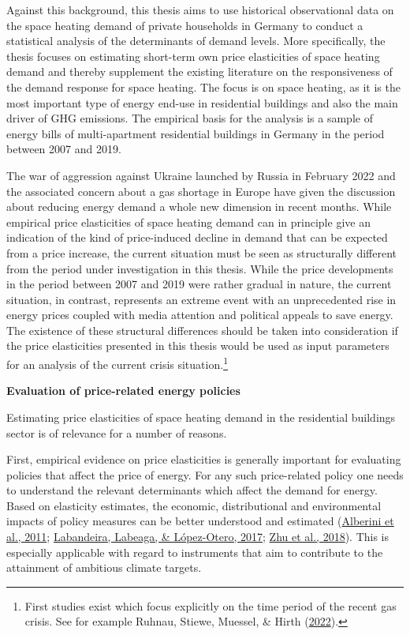\documentclass[12pt,twoside]{reedthesis}
\begin{document}
Against this background, this thesis aims to use historical observational data on the space heating demand of private households in Germany to conduct a statistical analysis of the determinants of demand levels. More specifically, the thesis focuses on estimating short-term own price elasticities of space heating demand and thereby supplement the existing literature on the responsiveness of the demand response for space heating. The focus is on space heating, as it is the most important type of energy end-use in residential buildings and also the main driver of GHG emissions. The empirical basis for the analysis is a sample of energy bills of multi-apartment residential buildings in Germany in the period between 2007 and 2019.

The war of aggression against Ukraine launched by Russia in February 2022 and the associated concern about a gas shortage in Europe have given the discussion about reducing energy demand a whole new dimension in recent months. While empirical price elasticities of space heating demand can in principle give an indication of the kind of price-induced decline in demand that can be expected from a price increase, the current situation must be seen as structurally different from the period under investigation in this thesis. While the price developments in the period between 2007 and 2019 were rather gradual in nature, the current situation, in contrast, represents an extreme event with an unprecedented rise in energy prices coupled with media attention and political appeals to save energy. The existence of these structural differences should be taken into consideration if the price elasticities presented in this thesis would be used as input parameters for an analysis of the current crisis situation.\footnote{First studies exist which focus explicitly on the time period of the recent gas crisis. See for example Ruhnau, Stiewe, Muessel, \& Hirth (\protect\hyperlink{ref-Ruhnau2022demand}{2022}).}

\textbf{Evaluation of price-related energy policies}

Estimating price elasticities of space heating demand in the residential buildings sector is of relevance for a number of reasons.

First, empirical evidence on price elasticities is generally important for evaluating policies that affect the price of energy. For any such price-related policy one needs to understand the relevant determinants which affect the demand for energy. Based on elasticity estimates, the economic, distributional and environmental impacts of policy measures can be better understood and estimated (\protect\hyperlink{ref-alberini_etal11}{Alberini et al., 2011}; \protect\hyperlink{ref-labandeira_etal17}{Labandeira, Labeaga, \& López-Otero, 2017}; \protect\hyperlink{ref-zhu_etal18}{Zhu et al., 2018}). This is especially applicable with regard to instruments that aim to contribute to the attainment of ambitious climate targets.
\end{document}
